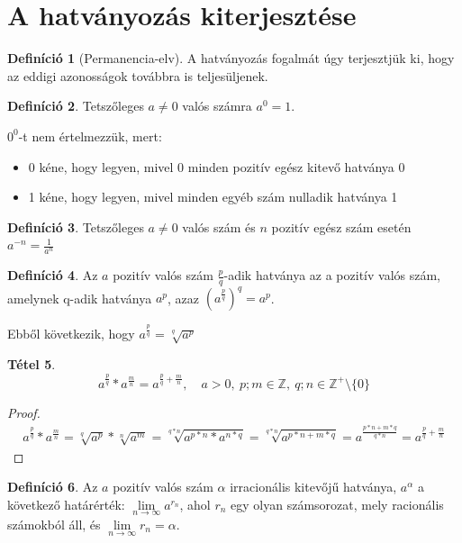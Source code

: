 \documentclass[twoside,12pt]{report}
\newtheorem{theorem}{Tétel}[section]
\theoremstyle{definition}
\newtheorem{definition}[theorem]{Definíció}
\begin{document}
\section{A hatványozás kiterjesztése}
	\begin{definition}[Permanencia-elv]
		A hatványozás fogalmát úgy terjesztjük ki, hogy az eddigi azonosságok továbbra is teljesüljenek.
	\end{definition}
	\begin{definition}
		Tetszőleges $a\ne0$ valós számra $a^0=1$.
	\end{definition}
	$0^0$-t nem értelmezzük, mert:
	\begin{itemize}
		\item 0 kéne, hogy legyen, mivel 0 minden pozitív egész kitevő hatványa 0
		\item 1 kéne, hogy legyen, mivel minden egyéb szám nulladik hatványa 1
	\end{itemize}
	\begin{definition}
		Tetszőleges $a\ne0$ valós szám és $n$ pozitív egész szám esetén $a^{-n}=\frac{1}{a^n}$
	\end{definition}
	\begin{definition}
		Az $a$ pozitív valós szám $\frac{p}{q}$-adik hatványa az a pozitív valós szám, amelynek q-adik hatványa $a^p$, azaz $\left(a^{\frac{p}{q}}\right)^q=a^p$.
	\end{definition}
	Ebből következik, hogy $a^\frac{p}{q}=\sqrt[q]{a^p}$
	\begin{theorem}
		\begin{equation*}
			a^{\frac{p}{q}}*a^\frac{m}{n}=a^{\frac{p}{q}+\frac{m}{n}},\quad a>0,\ p;m\in\mathbb{Z},\ q;n\in\mathbb{Z}^+\setminus\{0\}
		\end{equation*}
	\end{theorem}
	\begin{proof}
		\begin{align*}
			a^\frac{p}{q}*a^\frac{m}{n}=\sqrt[q]{a^p}*\sqrt[n]{a^m}=\sqrt[q*n]{a^{p*n}*a^{n*q}}=\sqrt[q*n]{a^{p*n+m*q}}=a^\frac{p*n+m*q}{q*n}=a^{\frac{p}{q}+\frac{m}{n}}
		\end{align*}
	\end{proof}
	\begin{definition}
		Az $a$ pozitív valós szám $\alpha$ irracionális kitevőjű hatványa, $a^\alpha$ a következő határérték: $\lim\limits_{n\rightarrow\infty} a^{r_n}$, ahol {$r_n$} egy olyan számsorozat, mely racionális számokból áll, és $\lim\limits_{n\rightarrow\infty}r_n=\alpha$.
	\end{definition}
\end{document}
